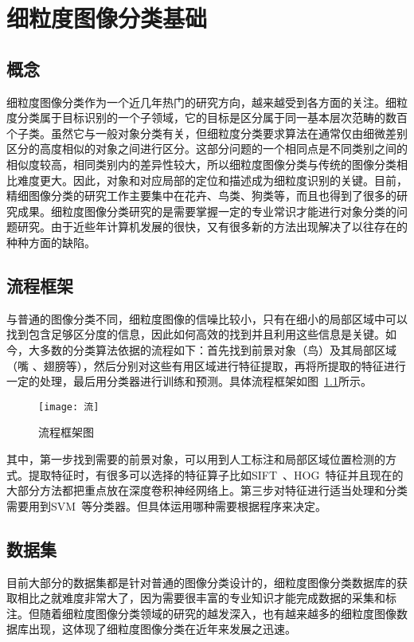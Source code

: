 \chapter{细粒度图像分类基础}
\label{cha:fenleijichu}

\section{概念}
\label{sec:fenleigainian}
细粒度图像分类作为一个近几年热门的研究方向，越来越受到各方面的关注。细粒度分类属于目标识别的一个子领域，它的目标是区分属于同一基本层次范畴的数百个子类。虽然它与一般对象分类有关，但细粒度分类要求算法在通常仅由细微差别区分的高度相似的对象之间进行区分。这部分问题的一个相同点是不同类别之间的相似度较高，相同类别内的差异性较大，所以细粒度图像分类与传统的图像分类相比难度更大。因此，对象和对应局部的定位和描述成为细粒度识别的关键。目前，精细图像分类的研究工作主要集中在花卉、鸟类、狗类等，而且也得到了很多的研究成果。细粒度图像分类研究的是需要掌握一定的专业常识才能进行对象分类的问题研究。由于近些年计算机发展的很快，又有很多新的方法出现解决了以往存在的种种方面的缺陷。
\section{流程框架}
\label{sec:liucheng}

与普通的图像分类不同，细粒度图像的信噪比较小，只有在细小的局部区域中可以找到包含足够区分度的信息，因此如何高效的找到并且利用这些信息是关键。如今，大多数的分类算法依据的流程如下：首先找到前景对象（鸟）及其局部区域（嘴 、翅膀等），然后分别对这些有用区域进行特征提取，再将所提取的特征进行一定的处理，最后用分类器进行训练和预测。具体流程框架如图~\ref{fig:kuangjia}所示。
\begin{figure}[H] %
  \centering
  \texttt{[image: 流]}
  \caption{流程框架图}
  \label{fig:kuangjia}
\end{figure}
其中，第一步找到需要的前景对象，可以用到人工标注和局部区域位置检测的方式。提取特征时，有很多可以选择的特征算子比如SIFT~\cite{lowe1999object}、HOG~\cite{dalal2005histograms}特征并且现在的大部分方法都把重点放在深度卷积神经网络上。第三步对特征进行适当处理和分类需要用到SVM~\cite{cortes1995support}等分类器。但具体运用哪种需要根据程序来决定。
\section{数据集}
\label{sec:shujuji}
目前大部分的数据集都是针对普通的图像分类设计的，细粒度图像分类数据库的获取相比之就难度非常大了，因为需要很丰富的专业知识才能完成数据的采集和标注。但随着细粒度图像分类领域的研究的越发深入，也有越来越多的细粒度图像数据库出现，这体现了细粒度图像分类在近年来发展之迅速。

